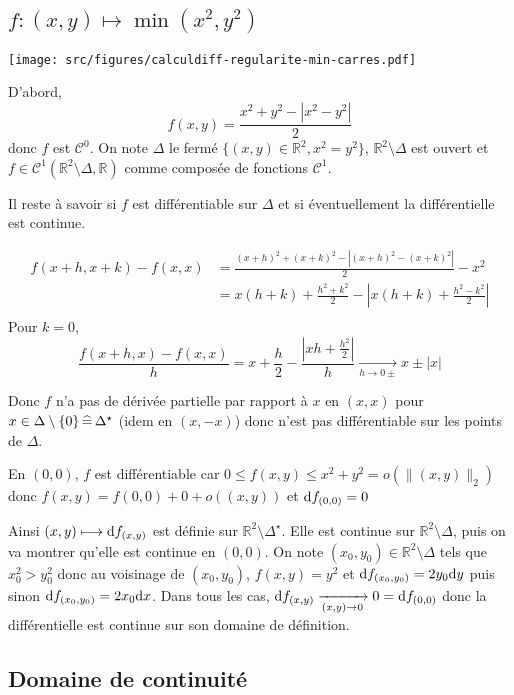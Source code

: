 \subsection{\texorpdfstring{$f:(x, y)\longmapsto \min(x^2, y^2)$}{f(x, y)=min(x², y²)}}

\begin{center}
    \texttt{[image: src/figures/calculdiff-regularite-min-carres.pdf]}
\end{center}

D'abord, \[
    f(x, y)=\frac{x^2+y^2-|x^2-y^2|}2
\]
donc $f$ est $\mathcal C^0$. On note $\Delta$ le fermé $\{(x, y)\in\mathbb R^2, x^2=y^2\}$, $\mathbb R^2\setminus \Delta$ est ouvert et $f\in \mathcal C^1(\mathbb R^2\setminus \Delta, \mathbb R)$ comme composée de fonctions $\mathcal C^1$.

Il reste à savoir si $f$ est différentiable sur $\Delta$ et si éventuellement la différentielle est continue.

\begin{align*}
    f(x+h, x+k)-f(x,x) &= \frac{(x+h)^2+(x+k)^2-|(x+h)^2-(x+k)^2|}{2}-x^2 \\
                       &= x(h+k)+\frac{h^2+k^2}2 - \left|x(h+k)+ \frac{h^2-k^2}{2}  \right| \\
\end{align*}
Pour $k=0$, \[
    \frac{f(x+h, x)-f(x, x)}h=x+\frac h2-\frac{\left|xh+\frac{h^2}2\right|}h\xrightarrow[h\to0\pm]{}x\pm|x|
\]

Donc $f$ n'a pas de dérivée partielle par rapport à $x$ en $(x, x)$ pour $x\in\Delta\setminus\{0\}\,\widehat=\,\Delta^\star$ (idem en $(x, -x)$) donc n'est pas différentiable sur les points de $\Delta$.

En $(0, 0)$, $f$ est différentiable car $0\leq f(x, y)\leq x^2+y^2=o(\|(x, y)\|_2)$ donc $f(x, y)=f(0, 0)+0+o((x, y))$ et $\mathrm{d} f_{(0, 0)}=0$

Ainsi $(x, y)\longmapsto \mathrm{d} f_{(x, y)}$ est définie sur $\mathbb R^2\setminus \Delta^\star$. Elle est continue sur $\mathbb R^2\setminus \Delta$, puis on va montrer qu'elle est continue en $(0, 0)$. On note $(x_0, y_0)\in\mathbb R^2\setminus \Delta$ tels que $x_0^2>y_0^2$ donc au voisinage de $(x_0, y_0)$, $f(x, y)=y^2$ et $\mathrm{d} f_{(x_0, y_0)}=2y_0\mathrm{d} y$ puis sinon $\mathrm{d} f_{(x_0, y_0)}=2x_0\mathrm{d} x$. Dans tous les cas, $\mathrm{d} f_{(x, y)}\xrightarrow[(x, y)\to 0]{}0=\mathrm{d} f_{(0, 0)}$ donc la différentielle est continue sur son domaine de définition.

\subsection{Domaine de continuité}

